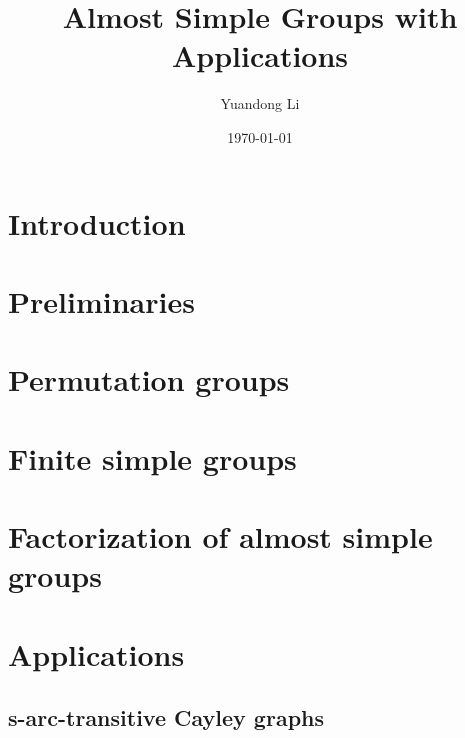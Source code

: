 \documentclass[a4,11pt]{article}
\title{Almost Simple Groups with Applications}
\author{Yuandong Li}
\date{\today}
\begin{document}
\maketitle

\tableofcontents

\section{Introduction}

\section{Preliminaries}

\section{Permutation groups}

\section{Finite simple groups}

\section{Factorization of almost simple groups}

\section{Applications}
\subsection{s-arc-transitive Cayley graphs}
\end{document}
